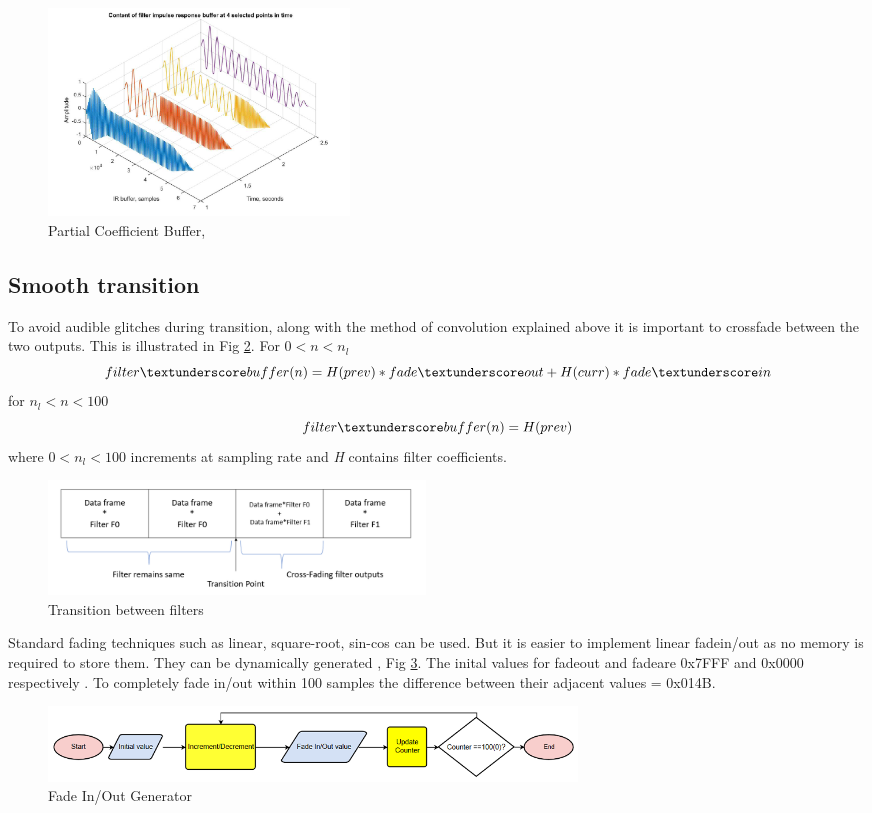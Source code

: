 \documentclass[conference]{IEEEtran}
\begin{document}
\begin{figure}
    \centering
    \includegraphics[width = 8cm]{coeffupdate.png}
    \caption{Partial Coefficient Buffer, \cite{live}}
    \label{fig:coeffupdate}
\end{figure}

\subsection{Smooth transition}
 To avoid audible glitches during transition, along with the method of convolution explained above it is important to crossfade between the two outputs. This is illustrated in Fig \ref{fig:crossfade}. 
 For $0<n<n_l$
 \begin{equation}
     filter \textunderscore buffer(n) = H(prev)*fade \textunderscore out + H(curr)*fade \textunderscore in
 \end{equation}
 for $n_l<n<100$ 
 \begin{equation}
     filter \textunderscore buffer(n) =  H(prev)
 \end{equation}
 where $0<n_l<100$ increments at sampling rate and \textit{H} contains filter coefficients.
 \begin{figure}
     \centering
     \includegraphics[width = 10cm]{Crossfade.png}
     \caption{Transition between filters}
     \label{fig:crossfade}
 \end{figure}
 
 Standard fading techniques such as linear, square-root, sin-cos can be used. But it is easier to implement linear fadein/out as no memory is required to store them. They can be dynamically generated , Fig \ref{fig:fadegen}. The inital values for fade\textunderscore out and  fade\textunderscore are 0x7FFF and 0x0000 respectively . To completely fade in/out within 100 samples the difference between their adjacent values = 0x014B. 
 \begin{figure}
     \centering
     \includegraphics[width = \linewidth, height = 2cm]{fade_gen.png}
     \caption{Fade In/Out Generator}
     \label{fig:fadegen}
 \end{figure}
 
\end{document}
